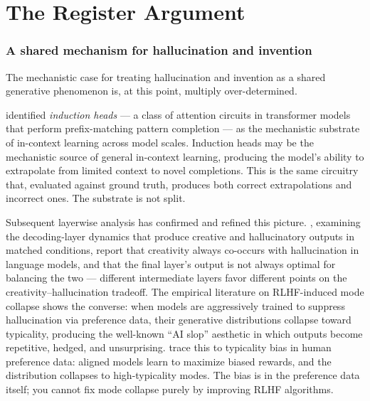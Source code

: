 \documentclass[11pt]{article}
\begin{document}
\part{The Register Argument}

\section{A shared mechanism for hallucination and invention}

The mechanistic case for treating hallucination and invention as a
shared generative phenomenon is, at this point, multiply over-determined.

\cite{olsson2022induction} identified \emph{induction heads} --- a
class of attention circuits in transformer models that perform
prefix-matching pattern completion --- as the mechanistic substrate of
in-context learning across model scales. Induction heads may be the
mechanistic source of general in-context learning, producing the
model's ability to extrapolate from limited context to novel
completions. This is the same circuitry that, evaluated against ground
truth, produces both correct extrapolations and incorrect ones. The
substrate is not split.

Subsequent layerwise analysis has confirmed and refined this picture.
\cite{jiang2025shakespearean}, examining the decoding-layer dynamics
that produce creative and hallucinatory outputs in matched conditions,
report that creativity always co-occurs with hallucination in language
models, and that the final layer's output is not always optimal for
balancing the two --- different intermediate layers favor different
points on the creativity--hallucination tradeoff. The empirical
literature on RLHF-induced mode collapse
\cite{hamilton2024mode, zhang2025verbalized} shows the converse: when
models are aggressively trained to suppress hallucination via
preference data, their generative distributions collapse toward
typicality, producing the well-known ``AI slop'' aesthetic in which
outputs become repetitive, hedged, and unsurprising.
\cite{zhang2025verbalized} trace this to typicality bias in human
preference data: aligned models learn to maximize biased rewards, and
the distribution collapses to high-typicality modes. The bias is in the
preference data itself; you cannot fix mode collapse purely by
improving RLHF algorithms.
\end{document}
